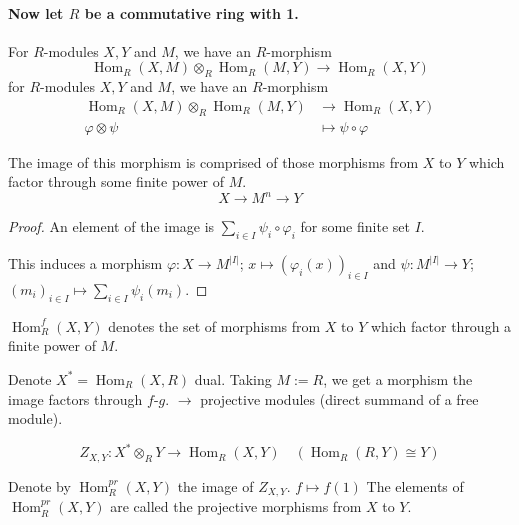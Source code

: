 \documentclass[11pt, a4paper]{report}
\begin{document}
\paragraph{Now let $R$ be a commutative ring with 1.}

For $R$-modules $X, Y$ and $M$, we have an $R$-morphism
\[
\operatorname{Hom}_{R}(X, M) \otimes_{R} \operatorname{Hom}_{R}(M, Y) \rightarrow \operatorname{Hom}_{R}(X, Y)
\]
for $R$-modules $X, Y$ and $M$, we have an $R$-morphism
\[
\begin{aligned}
\operatorname{Hom}_{R}(X, M) \otimes_{R} \operatorname{Hom}_{R}(M, Y) & \rightarrow \operatorname{Hom}_{R}(X, Y) \\
\varphi \otimes \psi & \longmapsto \psi \circ \varphi
\end{aligned}
\]

\begin{proposition}
The image of this morphism is comprised of those morphisms from $X$ to $Y$ which factor through some finite power of $M$.
\[
X \rightarrow M^{n} \rightarrow Y
\]
\end{proposition}

\begin{proof}
An element of the image is $\sum_{i \in I} \psi_{i} \circ \varphi_{i}$ for some finite set $I$.

This induces a morphism $\varphi\colon X \rightarrow M^{|I|}$; $x \mapsto \left(\varphi_{i}(x)\right)_{i \in I}$ and $\psi\colon M^{|I|} \rightarrow Y$; $\left(m_{i}\right)_{i \in I} \mapsto \sum_{i \in I} \psi_{i}\left(m_{i}\right)$.

\end{proof}

\begin{definition}
$\operatorname{Hom}_{R}^{f}(X, Y)$ denotes the set of morphisms from $X$ to $Y$ which factor through a finite power of $M$.
\end{definition}
Denote $X^{*}=\operatorname{Hom}_{R}(X, R)$ dual. Taking $M:=R$, we get a morphism the image factors through $f\text{-}g$. $\to$ projective modules (direct summand of a free module).

\[
Z_{X, Y}\colon X^{*} \otimes_{R} Y \rightarrow \operatorname{Hom}_{R}(X, Y) \quad\left(\operatorname{Hom}_{R}(R, Y) \cong Y\right)
\]

Denote by $\operatorname{Hom}_{R}^{pr}(X, Y)$ the image of $Z_{X, Y}$. $f \mapsto f(1)$ The elements of $\operatorname{Hom}_{R}^{pr}(X, Y)$ are called the projective morphisms from $X$ to $Y$.
\end{document}
